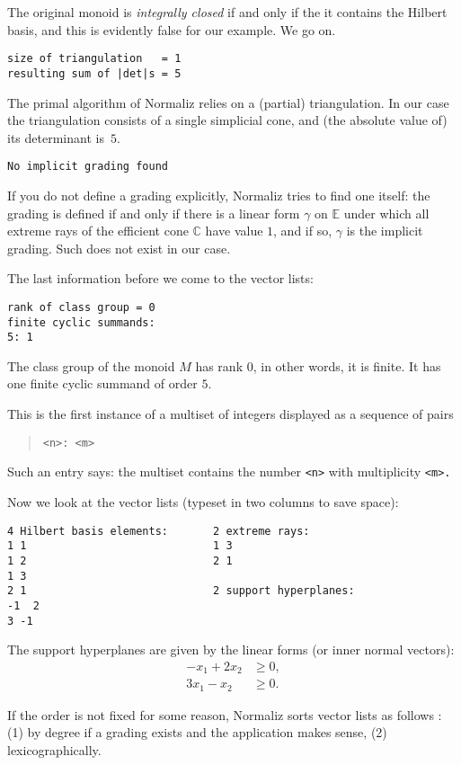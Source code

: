 \documentclass[12pt,a4paper]{scrartcl}
\theoremstyle{definition}
\def\CC{{\mathbb C}}
\def\EE{{\mathbb E}}
\begin{document}
The original monoid is \emph{integrally closed} if and only if the it contains the Hilbert basis, and this is evidently false for our example. We go on.

\begin{Verbatim}
size of triangulation   = 1
resulting sum of |det|s = 5
\end{Verbatim}
The primal algorithm of Normaliz relies on a (partial) triangulation. In our case the triangulation consists of a single simplicial cone, and (the absolute value of) its determinant is~$5$.
\begin{Verbatim}
No implicit grading found
\end{Verbatim}
If you do not define a grading explicitly, Normaliz tries to find one itself: the grading is defined if and only if there is a linear form $\gamma$ on $\EE$ under which all extreme rays of the efficient cone $\CC$ have value $1$, and if so, $\gamma$ is the implicit grading. Such does not exist in our case.

The last information before we come to the vector lists:
\begin{Verbatim}
rank of class group = 0
finite cyclic summands:
5: 1  
\end{Verbatim}
The class group of the monoid $M$ has rank $0$, in other words, it is finite. It has one finite cyclic summand of order $5$.

This is the first instance of a multiset of integers displayed as a sequence of pairs 
\begin{quote}
	\verb|<n>: <m>|
\end{quote} 
Such an entry says: the multiset contains the number \verb|<n>| with multiplicity \verb|<m>.| 


Now we look at the vector lists (typeset in two columns to save space):
\begin{Verbatim}
4 Hilbert basis elements:       2 extreme rays:
1 1                             1 3
1 2                             2 1
1 3
2 1                             2 support hyperplanes:
-1  2
3 -1
\end{Verbatim}

The support hyperplanes are given by the linear forms (or inner normal vectors):
\begin{align*}
-x_1+2x_2&\ge 0,\\
3x_1-x_2&\ge 0.
\end{align*}

If the order is not fixed for some reason, Normaliz sorts vector lists as follows : (1) by degree if a grading exists and the application makes sense, (2) lexicographically.
\end{document}
